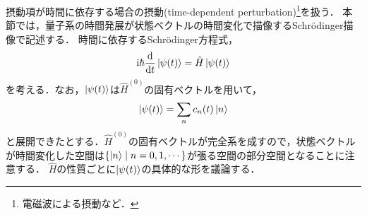 \documentclass{report}
\begin{document}
  摂動項が時間に依存する場合の摂動(time-dependent perturbation)\footnote{電磁波による摂動など．}を扱う．
  本節では，量子系の時間発展が状態ベクトルの時間変化で描像するSchr\"odinger描像で記述する．
  時間に依存するSchrödinger方程式，
  \begin{align}
    \mathrm{i}\hbar\dv{t}\ket{\psi(t)} = \hat{H}\ket{\psi(t)}\label{time-dependent-schroinger-eq}
  \end{align}
  を考える．なお，$\ket{\psi(t)}$は$\hat{H}^{(0)}$の固有ベクトルを用いて，
  \begin{align}
    \ket{\psi(t)} = \sum_{n}c_n(t)\ket{n}\label{psi-t-expantion}
  \end{align}
  と展開できたとする．$\hat{H}^{(0)}$の固有ベクトルが完全系を成すので，状態ベクトルが時間変化した空間は$\qty{\ket{n}\mid n = 0, 1, \cdots}$が張る空間の部分空間となることに注意する．
  $\hat{H}$の性質ごとに$\ket{\psi(t)}$の具体的な形を議論する．
\end{document}
